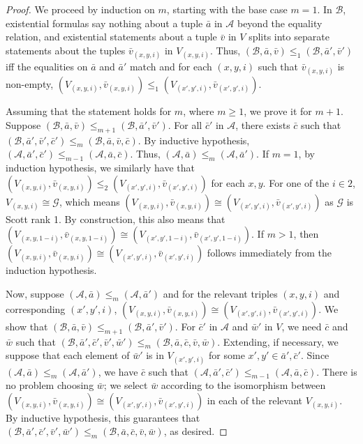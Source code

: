 \documentclass{article}
\begin{document}
\begin{proof}

We proceed by induction on $m$, starting with the base case $m = 1$.  In $\mathcal{B}$, existential formulas say nothing about a tuple $\bar{a}$ in $\mathcal{A}$ beyond the equality relation, and existential statements about a tuple $\bar{v}$ in $V$ splits into separate statements about the tuples $\bar{v}_{(x,y,i)}$ in $V_{(x,y,i)}$.  Thus, $(\mathcal{B},\bar{a},\bar{v})\leq_1(\mathcal{B},\bar{a}',\bar{v}')$ iff the equalities on $\bar{a}$ and $\bar{a}'$ match and for each $(x,y,i)$ such that 
$\bar{v}_{(x,y,i)}$ is non-empty, $(V_{(x,y,i)},\bar{v}_{(x,y,i)})\leq_1(V_{(x',y',i)},\bar{v}_{(x',y',i)})$. 

Assuming that the statement holds for $m$, where $m\geq 1$, we prove it for $m+1$.  Suppose $(\mathcal{B},\bar{a},\bar{v})\leq_{m+1}(\mathcal{B},\bar{a}',\bar{v}')$.  For all $\bar{c}'$ in $\mathcal{A}$, there exists $\bar{c}$ such that 
$(\mathcal{B},\bar{a}',\bar{v}',\bar{c}')\leq_m(\mathcal{B},\bar{a},\bar{v},\bar{c})$.
By inductive hypothesis, $(\mathcal{A},\bar{a}',\bar{c}')\leq_{m-1}(\mathcal{A},\bar{a},\bar{c})$.  Thus, $(\mathcal{A},\bar{a})\leq_m(\mathcal{A},\bar{a}')$.  
If $m=1$, by induction hypothesis, we similarly have that $(V_{(x,y,i)},\bar{v}_{(x,y,i)})\leq_2(V_{(x',y',i)},\bar{v}_{(x',y',i)})$ for each $x,y$.
For one of the $i\in2$,  $V_{(x,y,i)}\cong\mathcal{G}$, which means $(V_{(x,y,i)},\bar{v}_{(x,y,i)})\cong(V_{(x',y',i)},\bar{v}_{(x',y',i)})$ as $\mathcal{G}$ is Scott rank 1.
By construction, this also means that $(V_{(x,y,1-i)},\bar{v}_{(x,y,1-i)})\cong(V_{(x',y',1-i)},\bar{v}_{(x',y',1-i)})$.
If $m>1$, then $(V_{(x,y,i)},\bar{v}_{(x,y,i)})\cong(V_{(x',y',i)},\bar{v}_{(x',y',i)})$ follows immediately from the induction hypothesis.

  
Now, suppose $(\mathcal{A},\bar{a})\leq_m(\mathcal{A},\bar{a}')$ and for the relevant triples $(x,y,i)$  and corresponding $(x',y',i)$, $(V_{(x,y,i)},\bar{v}_{(x,y,i)})\cong (V_{(x',y',i)},\bar{v}_{(x',y',i)})$.  We show that $(\mathcal{B},\bar{a},\bar{v})\leq_{m+1}(\mathcal{B},\bar{a}',\bar{v}')$.  For $\bar{c}'$ in $\mathcal{A}$ and $\bar{w}'$ in $V$, we need $\bar{c}$ and $\bar{w}$ such that 
$(\mathcal{B},\bar{a}',\bar{c}',\bar{v}',\bar{w}')\leq_m(\mathcal{B},\bar{a},\bar{c},\bar{v},\bar{w})$.  Extending, if necessary, we suppose that each element of $\bar{w}'$ is in $V_{(x',y',i)}$ for some $x',y'\in \bar{a}',\bar{c}'$.  
Since $(\mathcal{A},\bar{a})\leq_m(\mathcal{A},\bar{a}')$, we have $\bar{c}$ such that $(\mathcal{A},\bar{a}',\bar{c}')\leq_{m-1}(\mathcal{A},\bar{a},\bar{c})$.  There is no problem choosing $\bar{w}$; we select $\bar{w}$ according to the isomorphism between $(V_{(x,y,i)},\bar{v}_{(x,y,i)})\cong (V_{(x',y',i)},\bar{v}_{(x',y',i)})$ in each of the relevant $V_{(x,y,i)}$. By inductive hypothesis, this guarantees that $(\mathcal{B},\bar{a}',\bar{c}',\bar{v}',\bar{w}')\leq_m(\mathcal{B},\bar{a},\bar{c},\bar{v},\bar{w})$, as desired.
\end{proof}
\end{document}
